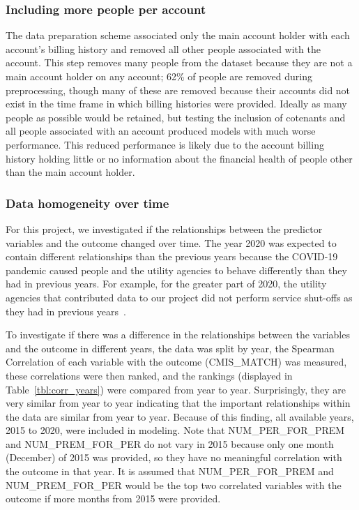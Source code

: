 \documentclass[10pt,letterpaper]{article}
\begin{document}
\subsubsection*{Including more people per account}
The data preparation scheme associated only the main account holder with each account's billing history and removed all other people associated with the account. This step removes many people from the dataset because they are not a main account holder on any account; 62\% of people are removed during preprocessing, though many of these are removed because their accounts did not exist in the time frame in which billing histories were provided. Ideally as many people as possible would be retained, but testing the inclusion of cotenants and all people associated with an account produced models with much worse performance. This reduced performance is likely due to the account billing history holding little or no information about the financial health of people other than the main account holder.

\subsubsection*{Data homogeneity over time}
For this project, we investigated if the relationships between the predictor variables and the outcome changed over time. The year 2020 was expected to contain different relationships than the previous years because the COVID-19 pandemic caused people and the utility agencies to behave differently than they had in previous years. For example, for the greater part of 2020, the utility agencies that contributed data to our project did not perform service shut-offs as they had in previous years~\cite{white2020utilities}. 

To investigate if there was a difference in the relationships between the variables and the outcome in different years, the data was split by year, the Spearman Correlation of each variable with the outcome (CMIS\_MATCH) was measured, these correlations were then ranked, and the rankings (displayed in Table~\ref{tbl:corr_years}) were compared from year to year. Surprisingly, they are very similar from year to year indicating that the important relationships within the data are similar from year to year. Because of this finding, all available years, 2015 to 2020, were included in modeling. Note that NUM\_PER\_FOR\_PREM and NUM\_PREM\_FOR\_PER do not vary in 2015 because only one month (December) of 2015 was provided, so they have no meaningful correlation with the outcome in that year. It is assumed that NUM\_PER\_FOR\_PREM and NUM\_PREM\_FOR\_PER would be the top two correlated variables with the outcome if more months from 2015 were provided.
\end{document}
